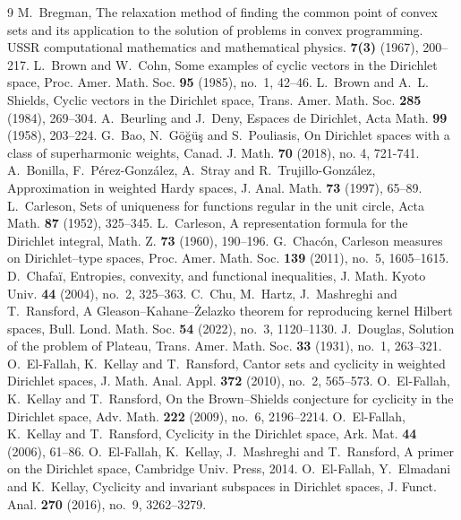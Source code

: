 \documentclass[12pt,reqno,a4paper]{amsart}
\numberwithin{equation}{section}
\begin{document}
\begin{thebibliography}{9}
		M.~Bregman, 
		The relaxation method of finding the common point of convex sets and its application to the solution of problems in convex programming. USSR computational mathematics and mathematical physics. \textbf{7(3)} (1967), 200--217.
		L.~Brown and W.~Cohn,
		Some examples of cyclic vectors in the Dirichlet space, Proc. Amer. Math. Soc. \textbf{95} (1985), no.~1, 42--46.
		L.~Brown and A.~L. Shields,
		Cyclic vectors in the Dirichlet space,
		Trans. Amer. Math. Soc. \textbf{285} (1984), 269--304.
		A.~Beurling and J.~Deny,
		Espaces de Dirichlet, Acta Math. \textbf{99} (1958), 203--224.
		G.~Bao, N.~G\"o\u{g}\"u\c{s} and S.~Pouliasis,
		On Dirichlet spaces with a class of superharmonic weights, Canad. J. Math. \textbf{70} (2018), no. 4, 721-741.
		A.~Bonilla, F.~P\'erez-Gonz\'alez, A.~Stray and R.~Trujillo-Gonz\'alez,
		Approximation in weighted Hardy spaces, J. Anal. Math. \textbf{73} (1997), 65--89.
		L.~Carleson,
		Sets of uniqueness for functions regular in the unit circle,
		Acta Math. \textbf{87} (1952), 325--345.
		L.~Carleson,
		A representation formula for the Dirichlet integral, Math. Z. \textbf{73} (1960), 190--196.
		G.~Chac\'on,
		Carleson measures on Dirichlet--type spaces, Proc. Amer. Math. Soc. \textbf{139} (2011), no.~5, 1605--1615.
		D.~Chafa\"i,
		Entropies, convexity, and functional inequalities, J. Math. Kyoto Univ. \textbf{44} (2004), no.~2, 325--363.
		C.~Chu, M.~Hartz, J.~Mashreghi and T.~Ransford,
		A Gleason--Kahane--\.Zelazko theorem for reproducing kernel Hilbert spaces, Bull. Lond. Math. Soc. \textbf{54} (2022), no.~3, 1120--1130.
		J.~Douglas,
		Solution of the problem of Plateau, Trans. Amer. Math. Soc. \textbf{33} (1931), no.~1, 263--321.
		O.~El-Fallah, K.~Kellay and T.~Ransford,
		Cantor sets and cyclicity in weighted Dirichlet spaces, J. Math. Anal. Appl. \textbf{372} (2010), no.~2, 565--573.
		O.~El-Fallah, K.~Kellay and T.~Ransford,
		On the Brown--Shields conjecture for cyclicity in the Dirichlet space, Adv. Math. \textbf{222} (2009), no.~6, 2196--2214.
		O.~El-Fallah, K.~Kellay and T.~Ransford,
		Cyclicity in the Dirichlet space, Ark. Mat. \textbf{44} (2006), 61--86.
		O.~El-Fallah, K.~Kellay, J.~Mashreghi and T.~Ransford, A primer on the Dirichlet space,
		Cambridge Univ. Press, 2014.
		O.~El-Fallah, Y.~Elmadani and K.~Kellay,
		Cyclicity and invariant subspaces in Dirichlet spaces, J. Funct. Anal. \textbf{270} (2016), no.~9, 3262--3279.

\end{thebibliography}
\end{document}
